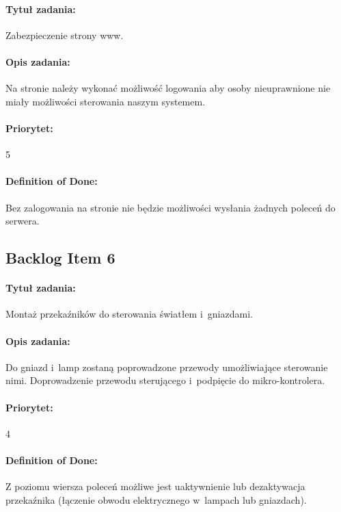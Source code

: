 	\paragraph{Tytuł zadania:}
	Zabezpieczenie strony www.
	
	\paragraph{Opis zadania:}
	Na stronie należy wykonać możliwość logowania aby osoby nieuprawnione nie miały możliwości sterowania naszym systemem.
	
	\paragraph{Priorytet:}
	5
	
	\paragraph{Definition of Done:}
	Bez zalogowania na stronie nie będzie możliwości wysłania żadnych poleceń do serwera.

	
	\subsection{Backlog Item 6}
	\paragraph{Tytuł zadania:} 
	Montaż przekaźników do sterowania światłem i~gniazdami.
	
	\paragraph{Opis zadania:} 
	Do gniazd i~lamp zostaną poprowadzone przewody umożliwiające sterowanie nimi. Doprowadzenie przewodu sterującego i~podpięcie do mikro-kontrolera.
	
	\paragraph{Priorytet:}
	4
	
	\paragraph{Definition of Done:}
	Z poziomu wiersza poleceń możliwe jest uaktywnienie lub dezaktywacja przekaźnika (łączenie obwodu elektrycznego w~lampach lub gniazdach).

